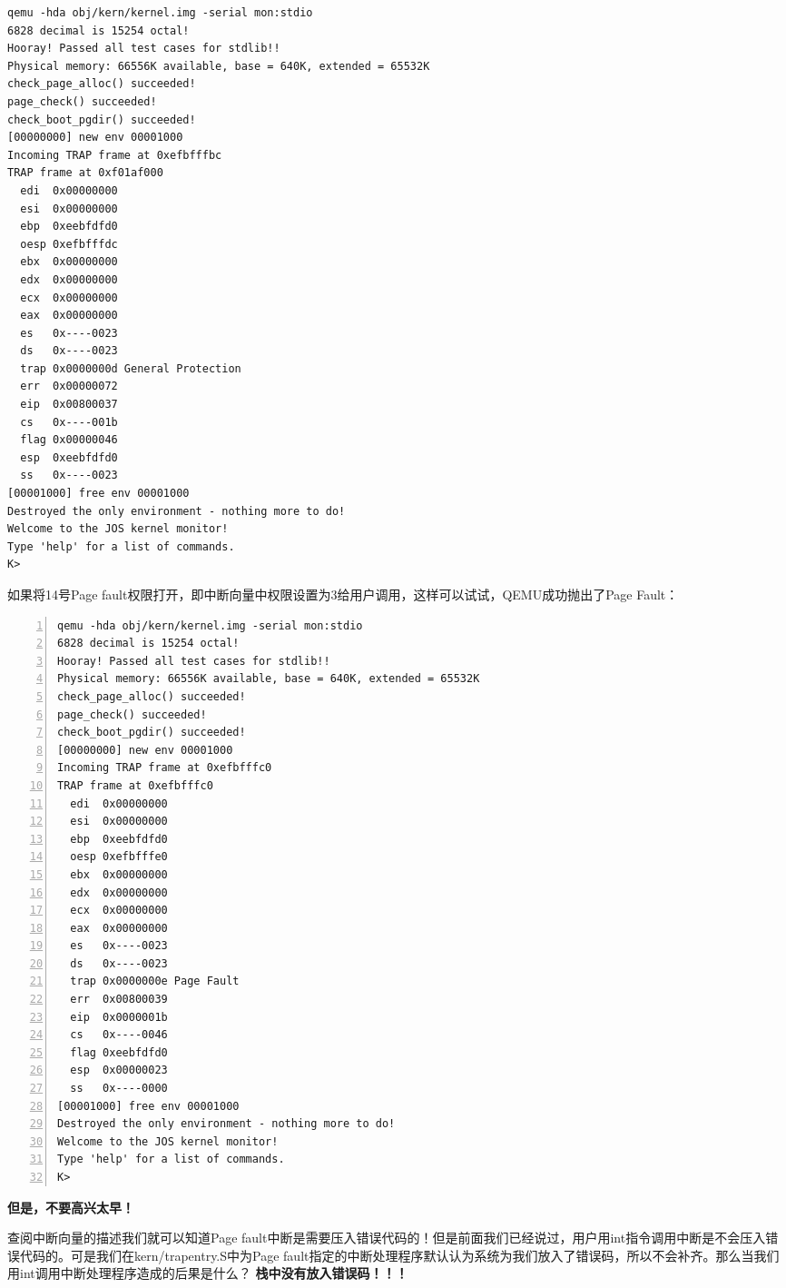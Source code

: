 \documentclass{article}
\newcommand{\highlight}[1]{{\bfseries \color{red}  #1}}
\begin{document}
\begin{CJK*}{UTF8}{gkai}
\begin{enumerate}
{\begin{lstlisting}[style=console]
qemu -hda obj/kern/kernel.img -serial mon:stdio
6828 decimal is 15254 octal!
Hooray! Passed all test cases for stdlib!!
Physical memory: 66556K available, base = 640K, extended = 65532K
check_page_alloc() succeeded!
page_check() succeeded!
check_boot_pgdir() succeeded!
[00000000] new env 00001000
Incoming TRAP frame at 0xefbfffbc
TRAP frame at 0xf01af000
  edi  0x00000000
  esi  0x00000000
  ebp  0xeebfdfd0
  oesp 0xefbfffdc
  ebx  0x00000000
  edx  0x00000000
  ecx  0x00000000
  eax  0x00000000
  es   0x----0023
  ds   0x----0023
  trap 0x0000000d General Protection
  err  0x00000072
  eip  0x00800037
  cs   0x----001b
  flag 0x00000046
  esp  0xeebfdfd0
  ss   0x----0023
[00001000] free env 00001000
Destroyed the only environment - nothing more to do!
Welcome to the JOS kernel monitor!
Type 'help' for a list of commands.
K> 
\end{lstlisting}

\vspace{2em}

如果将14号Page fault权限打开，即中断向量中权限设置为3给用户调用，这样可以试试，QEMU成功抛出了Page Fault：

\begin{lstlisting}[style=console, numbers=left]
qemu -hda obj/kern/kernel.img -serial mon:stdio
6828 decimal is 15254 octal!
Hooray! Passed all test cases for stdlib!!
Physical memory: 66556K available, base = 640K, extended = 65532K
check_page_alloc() succeeded!
page_check() succeeded!
check_boot_pgdir() succeeded!
[00000000] new env 00001000
Incoming TRAP frame at 0xefbfffc0
TRAP frame at 0xefbfffc0
  edi  0x00000000
  esi  0x00000000
  ebp  0xeebfdfd0
  oesp 0xefbfffe0
  ebx  0x00000000
  edx  0x00000000
  ecx  0x00000000
  eax  0x00000000
  es   0x----0023
  ds   0x----0023
  trap 0x0000000e Page Fault
  err  0x00800039
  eip  0x0000001b
  cs   0x----0046
  flag 0xeebfdfd0
  esp  0x00000023
  ss   0x----0000
[00001000] free env 00001000
Destroyed the only environment - nothing more to do!
Welcome to the JOS kernel monitor!
Type 'help' for a list of commands.
K> 
\end{lstlisting}

\highlight{\large 但是，不要高兴太早！} 

查阅中断向量的描述我们就可以知道Page fault中断是需要压入错误代码的！但是前面我们已经说过，用户用int指令调用中断是不会压入错误代码的。可是我们在kern/trapentry.S中为Page fault指定的中断处理程序默认认为系统为我们放入了错误码，所以不会补齐。那么当我们用int调用中断处理程序造成的后果是什么？\highlight{栈中没有放入错误码！！！} \\

}
\end{enumerate}
\end{CJK*}
\end{document}
